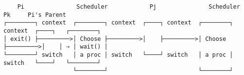 \documentclass[varwidth=70em,crop]{standalone}
\begin{document}
\begin{verbatim}
    Pi               Scheduler            Pj               Scheduler          Pk     Pi's Parent
┌────────┐ context  ┌────────┐ context  ┌────┐ context  ┌────────┐ context  ┌────┐   ┌────────┐
│ exit() ├─────────>│ Choose ├─────────>│    ├─────────>│ Choose ├─────────>│    │ ⇢ │ wait() │
└────────┘ switch   │ a proc │ switch   └────┘ switch   │ a proc │ switch   └────┘   └────────┘
                    └────────┘                          └────────┘
\end{verbatim}
\end{document}
